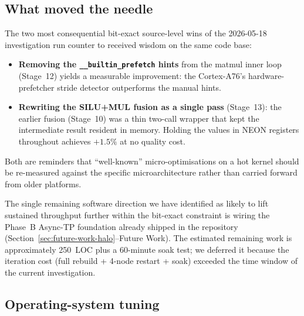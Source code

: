 \documentclass[10pt,a4paper]{article}
\begin{document}
\subsection{What moved the needle}

The two most consequential bit-exact source-level wins of the 2026-05-18 investigation run counter to received wisdom on the same code base:

\begin{itemize}
  \item \textbf{Removing the \texttt{\_\_builtin\_prefetch} hints} from the matmul inner loop (Stage~12) yields a measurable improvement: the Cortex-A76's hardware-prefetcher stride detector outperforms the manual hints.
  \item \textbf{Rewriting the SILU+MUL fusion as a single pass} (Stage~13): the earlier fusion (Stage~10) was a thin two-call wrapper that kept the intermediate result resident in memory. Holding the values in NEON registers throughout achieves $+1.5\%$ at no quality cost.
\end{itemize}

\noindent Both are reminders that ``well-known'' micro-optimisations on a hot kernel should be re-measured against the specific microarchitecture rather than carried forward from older platforms.

The single remaining software direction we have identified as likely to lift sustained throughput further within the bit-exact constraint is wiring the Phase~B Async-TP foundation already shipped in the repository (Section~\ref{sec:future-work-halo}--Future Work). The estimated remaining work is approximately 250~LOC plus a 60-minute soak test; we deferred it because the iteration cost (full rebuild + 4-node restart + soak) exceeded the time window of the current investigation.

\subsection{Operating-system tuning}
\end{document}
